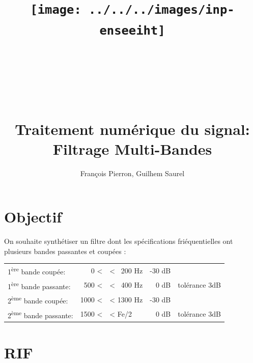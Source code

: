 \documentclass{article}
\title{\texttt{[image: ../../../images/inp-enseeiht]} \\ ~ \\ ~ \\ ~ \\ ~ \\ Traitement numérique du signal: \\ Filtrage Multi-Bandes}
\author{François Pierron, Guilhem Saurel}
\date{\oldstylenums{\today}}
\begin{document}
\begin{titlepage}
    \setcounter{page}{0}
    \maketitle
    \thispagestyle{empty}
    \tableofcontents
\end{titlepage}


\section{Objectif}

On souhaite synthétiser un filtre dont les spécifications friéquentielles ont plusieurs bandes passantes et coupées :

\begin{tabular}{lrlrl}
    1\textsuperscript{ère} bande coupée:   &    0 < & < ~200 \si\hertz & -30 dB &  \\
    1\textsuperscript{ère} bande passante: &  500 < & < ~400 \si\hertz &   0 dB & tolérance 3dB \\
    2\textsuperscript{ème} bande coupée:   & 1000 < & < 1300 \si\hertz & -30 dB &  \\
    2\textsuperscript{ème} bande passante: & 1500 < & <           Fe/2 &   0 dB & tolérance 3dB \\
\end{tabular}

\section{RIF}
\end{document}
